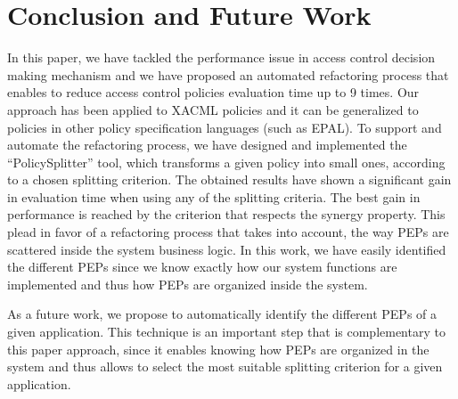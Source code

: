 \section{Conclusion and Future Work} \label{sec:conclusion}

In this paper, we have tackled the performance issue in access control decision making mechanism 
and we have proposed an
 automated refactoring  process  
that enables to reduce access control policies evaluation time up to 9 times.
Our approach has been applied to XACML policies and it can be generalized to policies in other policy specification
languages (such as EPAL). 
To support and automate the refactoring process, we have designed and implemented the ``PolicySplitter'' tool,
which transforms a given policy into small ones,
according to a chosen splitting criterion.
The obtained results have shown a significant gain in evaluation time when using any of the splitting criteria.
 The best gain in performance is reached by
the criterion that respects the synergy property. This plead in favor of a refactoring process that takes into
 account, the way PEPs are scattered inside the system business logic. 
In this work, we have easily identified the different PEPs since we know exactly how our system functions are
 implemented and thus how PEPs are organized inside the system.

As a future work, we propose to automatically identify the different PEPs of a given application. 
This technique is an important step that is complementary to this paper approach, since it enables
 knowing how PEPs are organized in the system and thus allows to select the most 
suitable splitting criterion for a given application. 